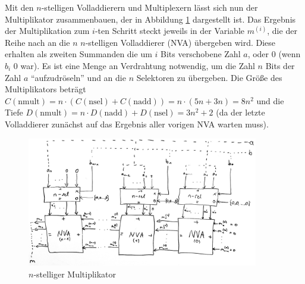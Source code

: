 \documentclass{article}
\begin{document}
    Mit den $n$-stelligen Volladdierern und Multiplexern lässt sich nun der Multiplikator zusammenbauen, der in Abbildung \ref{f:multiplikator} dargestellt ist. Das Ergebnis der Multiplikation zum $i$-ten Schritt steckt jeweils in der Variable $m^{(i)}$, die der Reihe nach an die $n$ $n$-stelligen Volladdierer (NVA) übergeben wird. Diese erhalten als zweiten Summanden die um $i$ Bits verschobene Zahl $a$, oder 0 (wenn $b_i$ 0 war). Es ist eine Menge an Verdrahtung notwendig, um die Zahl $n$ Bits der Zahl $a$ "`aufzudröseln"' und an die $n$ Selektoren zu übergeben. Die Größe des Multiplikators beträgt $C(\text{nmult}) = n\cdot(C(\text{nsel}) + C(\text{nadd})) = n \cdot (5n + 3n) = 8n^2$ und die Tiefe $D(\text{nmult}) = n\cdot D(\text{nadd}) + D(\text{nsel}) = 3n^2 + 2$ (da der letzte Volladdierer zunächst auf das Ergebnis aller vorigen NVA warten muss).
    \begin{figure}[h]
        \centering
        \includegraphics[width=0.9\textwidth]{multiplikator.jpeg}
        \caption{$n$-stelliger Multiplikator}
        \label{f:multiplikator}
    \end{figure}
\end{document}

